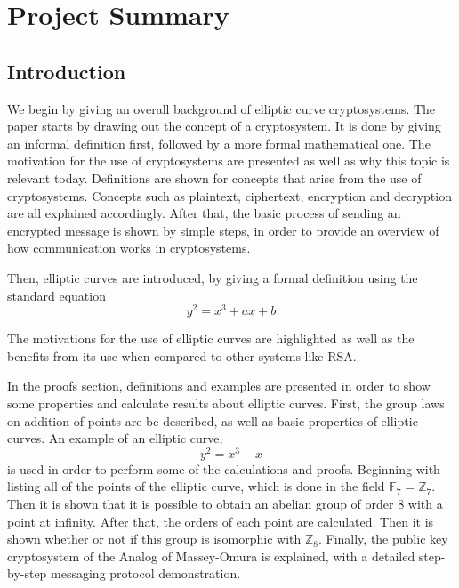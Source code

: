 \chapter{Project Summary}

\section{Introduction}

\hspace{10mm} We begin by giving an overall background of elliptic curve cryptosystems. The paper starts by drawing out the concept of a cryptosystem. It is done by giving an informal definition first, followed by a more formal mathematical one. The motivation for the use of cryptosystems are presented as well as why this topic is relevant today. Definitions are shown for concepts that arise from the use of cryptosystems. Concepts such as plaintext, ciphertext, encryption and decryption are all explained accordingly. After that, the basic process of sending an encrypted message is shown by simple steps, in order to provide an overview of how communication works in cryptosystems. 

\hspace{10mm} Then, elliptic curves are introduced, by giving a formal definition using the standard equation \begin{equation}
    y^2=x^3+ax+b
\end{equation}

\hspace{10mm} The motivations for the use of elliptic curves are highlighted as well as the benefits from its use when compared to other systems like RSA. 

\hspace{10mm} In the proofs section, definitions and examples are presented in order to show some properties and calculate results  about elliptic curves. First, the group laws on addition of points are be described, as well as basic properties of elliptic curves. An example of an elliptic curve, \begin{equation}
    y^2=x^3-x
\end{equation}
is used in order to perform some of the calculations and proofs. Beginning with listing all of the points of the elliptic curve, which is done in the field $\mathbb{F}_7=\mathbb{Z}_7$. Then it is shown that it is possible to obtain an abelian group of order 8 with a point at infinity. After that, the orders of each point are calculated. Then it is shown whether or not if this group is isomorphic with
$\mathbb{Z}_8$. Finally, the public key cryptosystem of the Analog of Massey-Omura is explained, with a detailed step-by-step messaging protocol demonstration.

